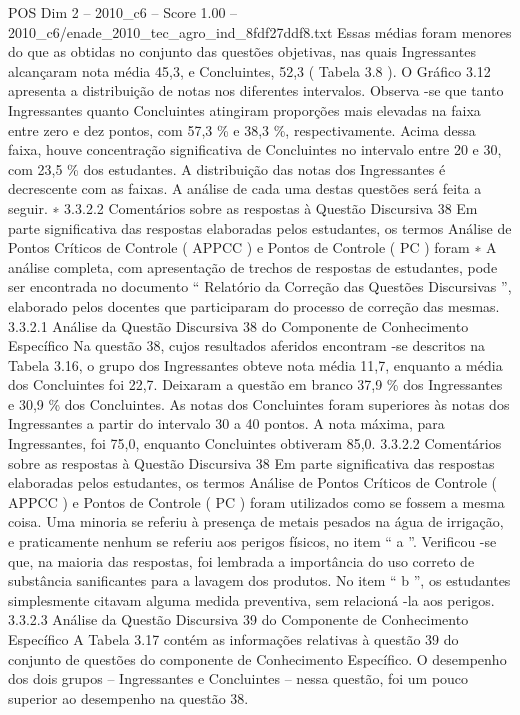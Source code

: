 \begin{textsample}{POS Dim 2 – 2010\_c6 – Score 1.00 – 2010\_c6/enade\_2010\_tec\_agro\_ind\_8fdf27ddf8.txt}
Essas médias foram menores do que as obtidas no conjunto das questões objetivas, nas quais Ingressantes alcançaram nota média 45,3, e Concluintes, 52,3 ( Tabela 3.8 ).
O Gráfico 3.12 apresenta a distribuição de notas nos diferentes intervalos.
Observa -se que tanto Ingressantes quanto Concluintes atingiram proporções mais elevadas na faixa entre zero e dez pontos, com 57,3 \% e 38,3 \%, respectivamente.
Acima dessa faixa, houve concentração significativa de Concluintes no intervalo entre 20 e 30, com 23,5 \% dos estudantes.
A distribuição das notas dos Ingressantes é decrescente com as faixas.
A análise de cada uma destas questões será feita a seguir. ∗ 3.3.2.2 Comentários sobre as respostas à Questão Discursiva 38 Em parte significativa das respostas elaboradas pelos estudantes, os termos Análise de Pontos Críticos de Controle ( APPCC ) e Pontos de Controle ( PC ) foram ∗ A análise completa, com apresentação de trechos de respostas de estudantes, pode ser encontrada no documento “ Relatório da Correção das Questões Discursivas ”, elaborado pelos docentes que participaram do processo de correção das mesmas. 3.3.2.1 Análise da Questão Discursiva 38 do Componente de Conhecimento Específico Na questão 38, cujos resultados aferidos encontram -se descritos na Tabela 3.16, o grupo dos Ingressantes obteve nota média 11,7, enquanto a média dos Concluintes foi 22,7.
Deixaram a questão em branco 37,9 \% dos Ingressantes e 30,9 \% dos Concluintes.
As notas dos Concluintes foram superiores às notas dos Ingressantes a partir do intervalo 30 a 40 pontos.
A nota máxima, para Ingressantes, foi 75,0, enquanto Concluintes obtiveram 85,0. 3.3.2.2 Comentários sobre as respostas à Questão Discursiva 38 Em parte significativa das respostas elaboradas pelos estudantes, os termos Análise de Pontos Críticos de Controle ( APPCC ) e Pontos de Controle ( PC ) foram utilizados como se fossem a mesma coisa.
Uma minoria se referiu à presença de metais pesados na água de irrigação, e praticamente nenhum se referiu aos perigos físicos, no item “ a ”.
Verificou -se que, na maioria das respostas, foi lembrada a importância do uso correto de substância sanificantes para a lavagem dos produtos.
No item “ b ”, os estudantes simplesmente citavam alguma medida preventiva, sem relacioná -la aos perigos. 3.3.2.3 Análise da Questão Discursiva 39 do Componente de Conhecimento Específico A Tabela 3.17 contém as informações relativas à questão 39 do conjunto de questões do componente de Conhecimento Específico.
O desempenho dos dois grupos – Ingressantes e Concluintes – nessa questão, foi um pouco superior ao desempenho na questão 38.

\end{textsample}
